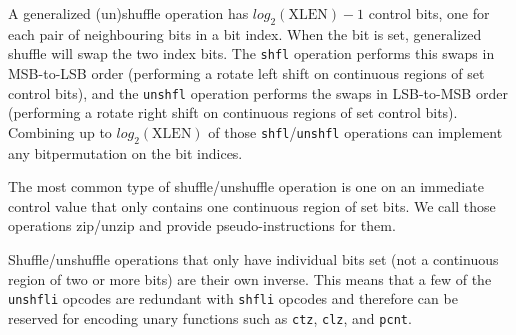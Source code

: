 A generalized (un)shuffle operation has $log_2(\textrm{XLEN})-1$ control bits,
one for each pair of neighbouring bits in a bit index. When the bit is set,
generalized shuffle will swap the two index bits. The {\tt shfl} operation
performs this swaps in MSB-to-LSB order (performing a rotate left shift on
continuous regions of set control bits), and the {\tt unshfl} operation performs
the swaps in LSB-to-MSB order (performing a rotate right shift on continuous
regions of set control bits). Combining up to $log_2(\textrm{XLEN})$ of those
{\tt shfl}/{\tt unshfl} operations can implement any bitpermutation on the
bit indices.

The most common type of shuffle/unshuffle operation is one on an immediate
control value that only contains one continuous region of set bits. We call
those operations zip/unzip and provide pseudo-instructions for them.

Shuffle/unshuffle operations that only have individual bits set (not a continuous
region of two or more bits) are their own inverse. This means that a few of the
{\tt unshfli} opcodes are redundant with {\tt shfli} opcodes and therefore can
be reserved for encoding unary functions such as {\tt ctz}, {\tt clz}, and {\tt pcnt}.

